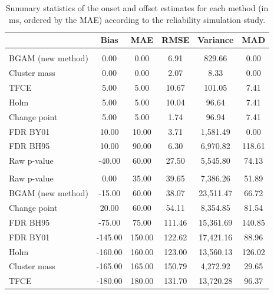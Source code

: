 \documentclass[
  doc,
  floatsintext,
  longtable,
  a4paper,
  nolmodern,
  notxfonts,
  notimes,
  donotrepeattitle,
  colorlinks=true,linkcolor=blue,citecolor=blue,urlcolor=blue]{apa7}
\begin{document}
\begin{table}

{\caption{{Summary statistics of the onset and offset estimates for each
method (in ms, ordered by the MAE) according to the reliability
simulation study.}{\label{tbl-reliability-results}}}}

\fontsize{9.0pt}{10.8pt}\selectfont
\begin{tabular*}{\linewidth}{@{\extracolsep{\fill}}lccccc}
\toprule
 & Bias & MAE & RMSE & Variance & MAD \\ 
\midrule\addlinespace[2.5pt]
\multicolumn{6}{l}{onset} \\[2.5pt] 
\midrule\addlinespace[2.5pt]
BGAM (new method) & 0.00 & 0.00 & 6.91 & 829.66 & 0.00 \\ 
Cluster mass & 0.00 & 0.00 & 2.07 & 8.33 & 0.00 \\ 
TFCE & 5.00 & 5.00 & 10.67 & 101.05 & 7.41 \\ 
Holm & 5.00 & 5.00 & 10.04 & 96.64 & 7.41 \\ 
Change point & 5.00 & 5.00 & 1.74 & 96.94 & 7.41 \\ 
FDR BY01 & 10.00 & 10.00 & 3.71 & 1,581.49 & 0.00 \\ 
FDR BH95 & 10.00 & 90.00 & 6.30 & 6,970.82 & 118.61 \\ 
Raw p-value & -40.00 & 60.00 & 27.50 & 5,545.80 & 74.13 \\ 
\midrule\addlinespace[2.5pt]
\multicolumn{6}{l}{offset} \\[2.5pt] 
\midrule\addlinespace[2.5pt]
Raw p-value & 0.00 & 35.00 & 39.65 & 7,386.26 & 51.89 \\ 
BGAM (new method) & -15.00 & 60.00 & 38.07 & 23,511.47 & 66.72 \\ 
Change point & 20.00 & 60.00 & 54.11 & 8,354.85 & 81.54 \\ 
FDR BH95 & -75.00 & 75.00 & 111.46 & 15,361.69 & 140.85 \\ 
FDR BY01 & -145.00 & 150.00 & 122.62 & 17,421.16 & 88.96 \\ 
Holm & -160.00 & 160.00 & 123.00 & 13,560.13 & 126.02 \\ 
Cluster mass & -165.00 & 165.00 & 150.79 & 4,272.92 & 29.65 \\ 
TFCE & -180.00 & 180.00 & 131.70 & 13,720.28 & 96.37 \\ 
\bottomrule
\end{tabular*}

\end{table}

\newpage
\end{document}
